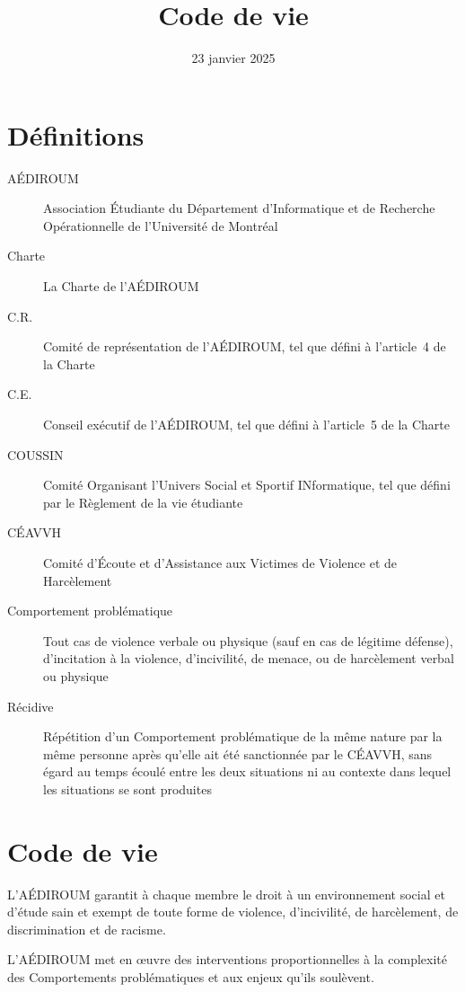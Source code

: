 \documentclass{aediroum}
\title{Code de vie}
\date{23 janvier 2025}
\begin{document}
\maketitle

\section{Définitions}

\begin{description}
    \item[AÉDIROUM] Association Étudiante du Département d’Informatique et de Recherche Opérationnelle de l’Université de Montréal
    \item[Charte] La Charte de l’AÉDIROUM
    \item[C.R.] Comité de représentation de l’AÉDIROUM, tel que défini à l’article~4 de la Charte
    \item[C.E.] Conseil exécutif de l’AÉDIROUM, tel que défini à l’article~5 de la Charte
    \item[COUSSIN] Comité Organisant l’Univers Social et Sportif INformatique, tel que défini par le Règlement de la vie étudiante
    \item[CÉAVVH] Comité d’Écoute et d’Assistance aux Victimes de Violence et de Harcèlement
    \item[Comportement problématique] Tout cas de violence verbale ou physique (sauf en cas de légitime défense), d’incitation à la violence, d’incivilité, de menace, ou de harcèlement verbal ou physique
    \item[Récidive] Répétition d’un Comportement problématique de la même nature par la même personne après qu’elle ait été sanctionnée par le CÉAVVH, sans égard au temps écoulé entre les deux situations ni au contexte dans lequel les situations se sont produites
\end{description}

\section{Code de vie}

L’AÉDIROUM garantit à chaque membre le droit à un environnement social et d’étude sain et exempt de toute forme de violence, d’incivilité, de harcèlement, de discrimination et de racisme.

L’AÉDIROUM met en œuvre des interventions proportionnelles à la complexité des Comportements problématiques et aux enjeux qu’ils soulèvent.
\end{document}
